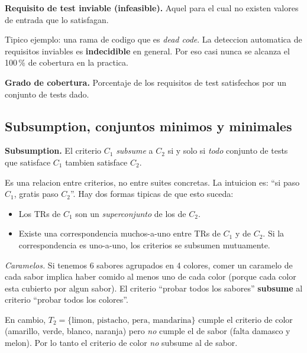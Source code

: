 \documentclass[12pt,a4paper]{article}
\begin{document}
\begin{definicionbox}
\textbf{Requisito de test inviable (infeasible).} Aquel para el cual no existen valores de
entrada que lo satisfagan.
\end{definicionbox}

Tipico ejemplo: una rama de codigo que es \textit{dead code}. La deteccion automatica de requisitos
inviables es \textbf{indecidible} en general. Por eso casi nunca se alcanza el 100\,\% de cobertura
en la practica.

\begin{definicionbox}
\textbf{Grado de cobertura.} Porcentaje de los requisitos de test satisfechos por un conjunto de
tests dado.
\end{definicionbox}

\subsection{Subsumption, conjuntos minimos y minimales}

\begin{definicionbox}
\textbf{Subsumption.} El criterio \(C_1\) \textit{subsume} a \(C_2\) si y solo si \emph{todo}
conjunto de tests que satisface \(C_1\) tambien satisface \(C_2\).
\end{definicionbox}

Es una relacion entre criterios, no entre suites concretas. La intuicion es: ``si paso \(C_1\),
gratis paso \(C_2\)''. Hay dos formas tipicas de que esto suceda:

\begin{itemize}
  \item Los TRs de \(C_1\) son un \emph{superconjunto} de los de \(C_2\).
  \item Existe una correspondencia muchos-a-uno entre TRs de \(C_1\) y de \(C_2\). Si la
  correspondencia es uno-a-uno, los criterios se subsumen mutuamente.
\end{itemize}

\begin{ejemplobox}
\textit{Caramelos.} Si tenemos 6 sabores agrupados en 4 colores, comer un caramelo de cada sabor
implica haber comido al menos uno de cada color (porque cada color esta cubierto por algun sabor).
El criterio ``probar todos los sabores'' \textbf{subsume} al criterio ``probar todos los colores''.

En cambio, \(T_2 = \{\text{limon, pistacho, pera, mandarina}\}\) cumple el criterio de color
(amarillo, verde, blanco, naranja) pero \emph{no} cumple el de sabor (falta damasco y melon). Por
lo tanto el criterio de color \emph{no} subsume al de sabor.
\end{ejemplobox}
\end{document}
